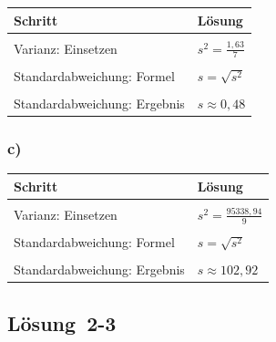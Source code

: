 \documentclass[
  11pt,
  ngerman,
  a4paper,
]{report}
\begin{document}
\begin{table}[H]
\centering
\begin{tabular}{>{\raggedright\arraybackslash}p{8cm}>{\raggedright\arraybackslash}p{8cm}}
\toprule
\textbf{Schritt} & \textbf{Lösung}\\
\midrule
\cellcolor{gray!6}{Varianz: Formel} & \cellcolor{gray!6}{$s^2=\frac{\sum\limits_{i=1}^{n}(x_{i}-\bar{x})^2}{n-1}$}\\
Varianz: Einsetzen & $s^2=\frac{1{,}63}{7}$\\
\cellcolor{gray!6}{Varianz: Ergebnis} & \cellcolor{gray!6}{$s^2=0{,}23$}\\
Standardabweichung: Formel & $s=\sqrt{s^2}$\\
\cellcolor{gray!6}{Standardabweichung: Einsetzen} & \cellcolor{gray!6}{$s=\sqrt{0{,}23}$}\\
Standardabweichung: Ergebnis & $s\approx0{,}48$\\
\bottomrule
\end{tabular}
\end{table}

\hypertarget{c-3}{%
\subsubsection{c)}\label{c-3}}

\begin{table}[H]
\centering
\begin{tabular}{>{\raggedright\arraybackslash}p{8cm}>{\raggedright\arraybackslash}p{8cm}}
\toprule
\textbf{Schritt} & \textbf{Lösung}\\
\midrule
\cellcolor{gray!6}{Varianz: Formel} & \cellcolor{gray!6}{$s^2=\frac{\sum\limits_{i=1}^{n}(x_{i}-\bar{x})^2}{n-1}$}\\
Varianz: Einsetzen & $s^2=\frac{95338{,}94}{9}$\\
\cellcolor{gray!6}{Varianz: Ergebnis} & \cellcolor{gray!6}{$s^2=10593{,}21$}\\
Standardabweichung: Formel & $s=\sqrt{s^2}$\\
\cellcolor{gray!6}{Standardabweichung: Einsetzen} & \cellcolor{gray!6}{$s=\sqrt{10593{,}21}$}\\
Standardabweichung: Ergebnis & $s\approx102{,}92$\\
\bottomrule
\end{tabular}
\end{table}

\hypertarget{loesung-2-3}{%
\subsection{Lösung~2-3}\label{loesung-2-3}}
\end{document}
